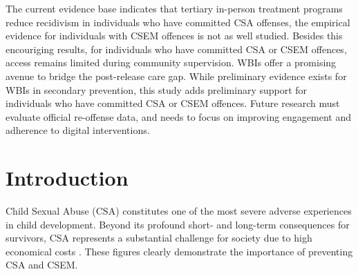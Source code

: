 \documentclass[
  super,
  preprint,
  1p,
  onecolumn]{elsarticle}
\begin{document}
The current evidence base indicates that tertiary in-person treatment
programs reduce recidivism in individuals who have committed CSA
offenses, the empirical evidence for individuals with CSEM offences is
not as well studied. Besides this encouriging results, for individuals
who have committed CSA or CSEM offences, access remains limited during
community supervision. WBIs offer a promising avenue to bridge the
post-release care gap. While preliminary evidence exists for WBIs in
secondary prevention, this study adds preliminary support for
individuals who have committed CSA or CSEM offences. Future research
must evaluate official re-offense data, and needs to focus on improving
engagement and adherence to digital interventions.

\newpage{}

\section{Introduction}\label{introduction}

Child Sexual Abuse (CSA) constitutes one of the most severe adverse
experiences in child development.
\citep{piolantiGlobalPrevalenceSexual2025} Beyond its profound short-
and long-term consequences for survivors, CSA represents a substantial
challenge for society due to high economical costs
\citep{kewleyPreventingChildSexual2023}. These figures clearly
demonstrate the importance of preventing CSA and CSEM.
\end{document}
